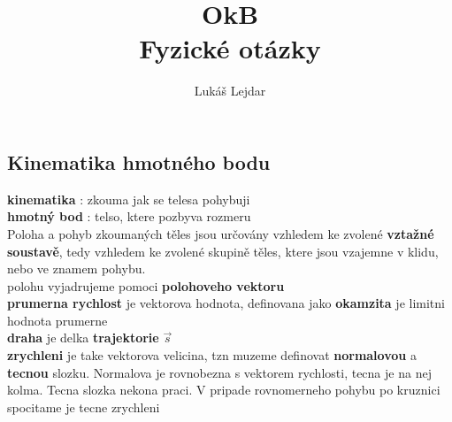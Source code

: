 \documentclass{report}
\title{\Huge{OkB}\\Fyzické otázky}
\author{\huge{Lukáš Lejdar}}
\date{}
\begin{document}
\maketitle
\newpage%
\tableofcontents
\pagebreak

\chapter{}


\section{Kinematika hmotného bodu}
\vspace{0.5cm}
\textbf{kinematika} : zkouma jak se telesa pohybuji \\
\textbf{hmotný bod} : telso, ktere pozbyva rozmeru \\ 
Poloha a pohyb zkoumaných těles jsou určovány vzhledem ke zvolené \textbf{vztažné soustavě}, tedy vzhledem ke zvolené skupině těles, ktere jsou vzajemne v klidu, nebo ve znamem pohybu. \\
polohu vyjadrujeme pomoci \textbf{polohoveho vektoru} \\
\textbf{prumerna rychlost} je vektorova hodnota, definovana jako 
\textbf{okamzita} je limitni hodnota prumerne \\    
\textbf{draha} je delka \textbf{trajektorie} $\vec{s}$ \\
\textbf{zrychleni} je take vektorova velicina, tzn muzeme definovat \textbf{normalovou} a \textbf{tecnou} slozku. Normalova je rovnobezna s vektorem rychlosti, tecna je na nej kolma. Tecna slozka nekona praci.
V pripade rovnomerneho pohybu po kruznici spocitame je tecne zrychleni 

\newpage

\end{document}

